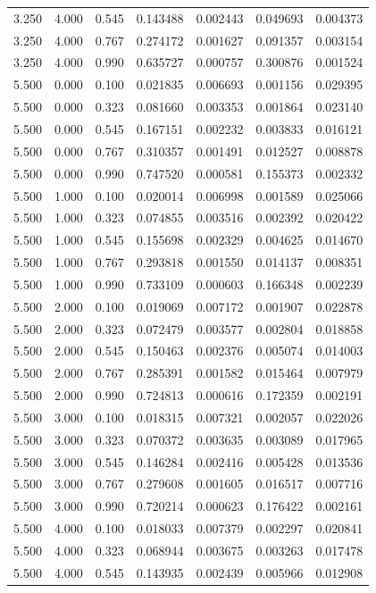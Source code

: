 \documentclass{article}
\begin{document}
\begin{longtable}{ccccccc}
    3.250& 4.000& 0.545&0.143488&0.002443&0.049693&0.004373\\
    3.250& 4.000& 0.767&0.274172&0.001627&0.091357&0.003154\\
    3.250& 4.000& 0.990&0.635727&0.000757&0.300876&0.001524\\
    5.500& 0.000& 0.100&0.021835&0.006693&0.001156&0.029395\\
    5.500& 0.000& 0.323&0.081660&0.003353&0.001864&0.023140\\
    5.500& 0.000& 0.545&0.167151&0.002232&0.003833&0.016121\\
    5.500& 0.000& 0.767&0.310357&0.001491&0.012527&0.008878\\
    5.500& 0.000& 0.990&0.747520&0.000581&0.155373&0.002332\\
    5.500& 1.000& 0.100&0.020014&0.006998&0.001589&0.025066\\
    5.500& 1.000& 0.323&0.074855&0.003516&0.002392&0.020422\\
    5.500& 1.000& 0.545&0.155698&0.002329&0.004625&0.014670\\
    5.500& 1.000& 0.767&0.293818&0.001550&0.014137&0.008351\\
    5.500& 1.000& 0.990&0.733109&0.000603&0.166348&0.002239\\
    5.500& 2.000& 0.100&0.019069&0.007172&0.001907&0.022878\\
    5.500& 2.000& 0.323&0.072479&0.003577&0.002804&0.018858\\
    5.500& 2.000& 0.545&0.150463&0.002376&0.005074&0.014003\\
    5.500& 2.000& 0.767&0.285391&0.001582&0.015464&0.007979\\
    5.500& 2.000& 0.990&0.724813&0.000616&0.172359&0.002191\\
    5.500& 3.000& 0.100&0.018315&0.007321&0.002057&0.022026\\
    5.500& 3.000& 0.323&0.070372&0.003635&0.003089&0.017965\\
    5.500& 3.000& 0.545&0.146284&0.002416&0.005428&0.013536\\
    5.500& 3.000& 0.767&0.279608&0.001605&0.016517&0.007716\\
    5.500& 3.000& 0.990&0.720214&0.000623&0.176422&0.002161\\
    5.500& 4.000& 0.100&0.018033&0.007379&0.002297&0.020841\\
    5.500& 4.000& 0.323&0.068944&0.003675&0.003263&0.017478\\
    5.500& 4.000& 0.545&0.143935&0.002439&0.005966&0.012908\\

\end{longtable}
\end{document}
